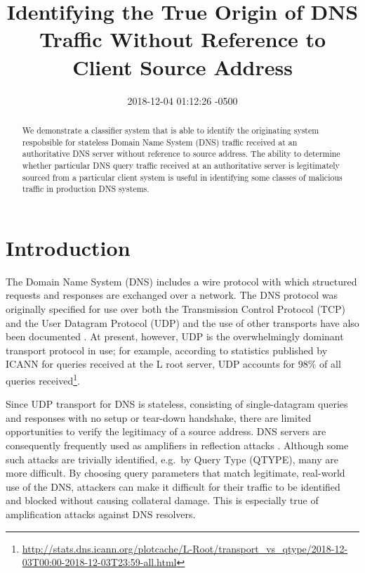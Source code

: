 \documentclass[conference]{IEEEtran}
\title{Identifying the True Origin of DNS Traffic Without Reference to Client
Source Address}
\author{\IEEEauthorblockN{Joe Abley}\IEEEauthorblockA{Western University, London, Ontario, Canada \\ Afilias Canada, Toronto, Ontario, Canada \\ \href{mailto:jabley@uwo.ca}{\nolinkurl{jabley@uwo.ca}},
\href{mailto:jabley@afilias.info}{\nolinkurl{jabley@afilias.info}}}}
\date{2018-12-04 01:12:26 -0500}
\let\citep\cite
\begin{document}
\maketitle
\begin{abstract}
We demonstrate a classifier system that is able to identify the
originating system respobsible for stateless Domain Name System (DNS)
traffic received at an authoritative DNS server without reference to
source address. The ability to determine whether particular DNS query
traffic received at an authoritative server is legitimately sourced from
a particular client system is useful in identifying some classes of
malicious traffic in production DNS systems.
\end{abstract}

\section{Introduction}\label{sec:introduction}

\label{sec:introduction}

The Domain Name System (DNS) includes a wire protocol with which
structured requests and responses are exchanged over a network. The DNS
protocol was originally specified \citep{rfc1034}\citep{rfc1035} for use
over both the Transmission Control Protocol (TCP) \citep{rfc793} and the
User Datagram Protocol (UDP) \citep{rfc768} and the use of other
transports have also been documented
\citep{rfc7858}\citep{rfc8484}\citep{huitema-quic-dnsoquic-05}. At
present, however, UDP is the overwhelmingly dominant transport protocol
in use; for example, according to statistics published by ICANN for
queries received at the L root server, UDP accounts for 98\% of all
queries
received\footnote{\url{http://stats.dns.icann.org/plotcache/L-Root/transport_vs_qtype/2018-12-03T00:00-2018-12-03T23:59-all.html}}.

Since UDP transport for DNS is stateless, consisting of single-datagram
queries and responses with no setup or tear-down handshake, there are
limited opportunities to verify the legitimacy of a source address. DNS
servers are consequently frequently used as amplifiers in reflection
attacks \citep{rfc5358}. Although some such attacks are trivially
identified, e.g.~by Query Type (QTYPE), many are more difficult. By
choosing query parameters that match legitimate, real-world use of the
DNS, attackers can make it difficult for their traffic to be identified
and blocked without causing collateral damage. This is especially true
of amplification attacks against DNS resolvers.
\end{document}
